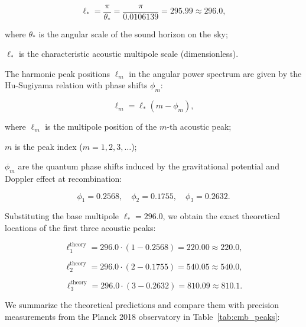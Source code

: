 \begin{equation}\label{eq:4.60}\tag{4.60}
\ell_* = \frac{\pi}{\theta_*} = \frac{\pi}{0.0106139} = 295.99 \approx 296.0,
\end{equation}

where $\theta_*$ is the angular scale of the sound horizon on the sky;  

$\ell_*$ is the characteristic acoustic multipole scale (dimensionless).

The harmonic peak positions $\ell_m$ in the angular power spectrum are given by the Hu-Sugiyama relation \cite{ref35} with phase shifts $\phi_m$:

\begin{equation}\label{eq:4.61}\tag{4.61}
\ell_m = \ell_* (m - \phi_m),
\end{equation}

where $\ell_m$ is the multipole position of the $m$-th acoustic peak;  

$m$ is the peak index ($m = 1, 2, 3, \dots$);  

$\phi_m$ are the quantum phase shifts induced by the gravitational potential and Doppler effect at recombination:

\begin{equation}\label{eq:4.62}\tag{4.62}
\phi_1 = 0.2568, \quad \phi_2 = 0.1755, \quad \phi_3 = 0.2632.
\end{equation}

Substituting the base multipole $\ell_* = 296.0$, we obtain the exact theoretical locations of the first three acoustic peaks:

\begin{equation}\label{eq:4.63}\tag{4.63}
\ell_1^{\text{theory}} = 296.0 \cdot (1 - 0.2568) = 220.00 \approx 220.0,
\end{equation}

\begin{equation}\label{eq:4.64}\tag{4.64}
\ell_2^{\text{theory}} = 296.0 \cdot (2 - 0.1755) = 540.05 \approx 540.0,
\end{equation}

\begin{equation}\label{eq:4.65}\tag{4.65}
\ell_3^{\text{theory}} = 296.0 \cdot (3 - 0.2632) = 810.09 \approx 810.1.
\end{equation}

We summarize the theoretical predictions and compare them with precision measurements from the Planck 2018 observatory in Table~\ref{tab:cmb_peaks}:

